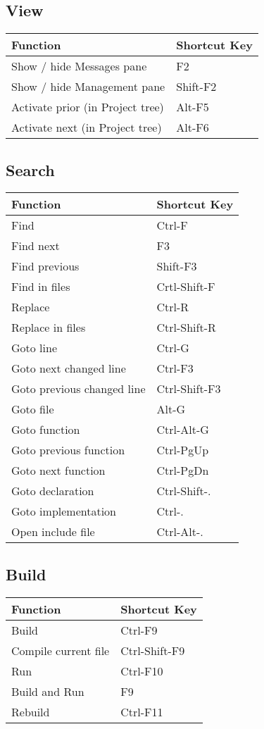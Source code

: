 \subsection{View}

\begin{tabular}{|l|l|}\hline
Function 		&	Shortcut Key\\ \hline
Show / hide Messages pane	&	F2\\ \hline
Show / hide Management pane 	&	Shift-F2\\ \hline
Activate prior (in Project tree) & 	Alt-F5\\ \hline
Activate next (in Project tree)  &	Alt-F6\\ \hline
\end{tabular}

\subsection{Search}

\begin{tabular}{|l|l|}\hline
Function 	&	Shortcut Key\\ \hline
Find 		&	Ctrl-F\\ \hline
Find next 	&	F3\\ \hline
Find previous 	&	Shift-F3\\ \hline
Find in files 	&	Crtl-Shift-F\\ \hline
Replace 	&	Ctrl-R\\ \hline
Replace in files &	Ctrl-Shift-R\\ \hline
Goto line 	&	Ctrl-G\\ \hline
Goto next changed line 	&	Ctrl-F3\\ \hline
Goto previous changed line 	&	Ctrl-Shift-F3\\ \hline
Goto file 	&	Alt-G\\ \hline
Goto function 	&	Ctrl-Alt-G\\ \hline
Goto previous function & Ctrl-PgUp\\ \hline
Goto next function & Ctrl-PgDn\\ \hline
Goto declaration & Ctrl-Shift-.\\ \hline
Goto implementation & Ctrl-.\\ \hline
Open include file & Ctrl-Alt-.\\ \hline
\end{tabular}

\subsection{Build}

\begin{tabular}{|l|l|}\hline
Function 	&	Shortcut Key\\ \hline
Build 		&	Ctrl-F9\\ \hline
Compile current file	&	Ctrl-Shift-F9\\ \hline
Run		&	Ctrl-F10\\ \hline
Build and Run 	&	F9\\ \hline
Rebuild 	&	Ctrl-F11\\ \hline
\end{tabular}
